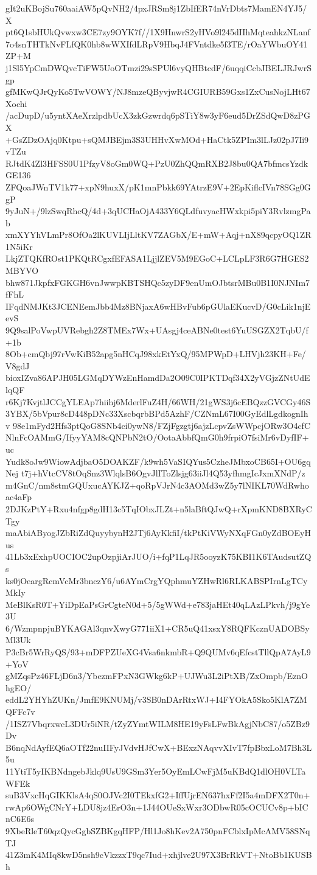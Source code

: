 gIt2uKBojSu760aaiAW5pQvNH2/4pxJRSm8j1ZbIfER74nVrDbts7MamEN4YJ5/X
pt6Q1sbHUkQvwxw3CE7zy9OYK7f//1X9HnwrS2yHVo9l245dIIhMqteahkzNLanf
7o4snTHTkNvFLfQK0hb8wWXIfdLRpV9HbqJ4FVntdke5f3TE/rOaYWbuOY41ZP+M
j1Sl5YpCmDWQvcTiFW5UoOTmzi29sSPUl6vyQHBtcdF/6uqqiCcbJBELJRJwrSgp
gfMKwQJrQyKo5TwVOWY/NJ8mzeQByvjwR4CGIURB59Gxs1ZxCusNojLHt67Xochi
/acDupD/u5yntXAeXrzlpdbUcX3zkGzwrdq6pSTiY8w3yF6eud5DrZSdQwD8zPGX
+GsZDzOAjq0Ktpu+sQMJBEjm3S3UHHvXwMOd+HaCtk5ZPIm3lLJz02pJ7Ii9vTZu
RJtdK4Zl3HFSS0U1PfzyV8oGm0WQ+PzU0ZhQQmRXB2J8bu0QA7bfmcsYzdkGE136
ZFQoaJWnTV1k77+xpN9huxX/pK1mnPbkk69YAtrzE9V+2EpKiflcIVn78SGg0GgP
9yJuN+/9lzSwqRhcQ/4d+3qUCHaOjA433Y6QLdfuvyacHWxkpi5piY3RvlzmgPab
xmXYYhVLmPr8OfOa2lKUVLIjLltKV7ZAGbX/E+mW+Aqj+nX89qcpyOQ1ZR1N5iKr
LkjZTQKfROst1PKQtRCgxfEFASA1LjjlZEV5M9EGoC+LCLpLF3R6G7HGES2MBYVO
bhw871JkpfxFGKGH6vnJwwpKBTSHQc5zyDF9enUmOJbtsrMBu0B1I0NJNIm7fFhL
IFqdNMJKt3JCENEemJbb4Mz8BNjaxA6wHBvFub6pGUlaEKucvD/G0cLik1njEevS
9Q9salPoVwpUVRebgh2Z8TMEx7Wx+UAsgj4ceABNe0test6YuUSGZX2TqbU/f+1b
8Ob+cmQbj97rVwKiB52apg5nHCqJ98xkEtYxQ/95MPWpD+LHVjh23KH+Fe/V8gdJ
bioxIZva86APJH05LGMqDYWzEnHamdDa2O09C0IPKTDqf34X2yVGjzZNtUdElqQF
r6Kj7KvjtlJCCgYLEAp7hiihj6MderlFuZ4H/66WH/21gWS3j6cEBQzzGVCGy46S
3YBX/5bVpur8cD448pDNc33XscbqrbBPd5AzhF/CZNmL67I00GyEdlLgdkognIhv
98e1mFyd2Hfs3ptQoG8SNb4ci0ywN8/FZjFgzgtj6ajzLcpvZsWWpcjORw3O4cfC
NlnFcOAMmG/IfyyYAM8cQNPbN2tO/OotaAbbfQmG0h9frpiO7fsiMr6vDyfIF+uc
Yudk8oJw9WiowAdjbaO5DOAKZF/k9wh5VaSIQYus5CzheJMbxoCB65I+OU6gqNej
t7j+hVtcCV8tOqSnz3WlqlsB6OgvJlIToZlsjg63iiJl4Q53yfhmgIcJxmXNdP/z
m4GnC/nm8stmGQUxucAYKJZ+qoRpVJrN4c3AOMd3wZ5y7lNIKL70WdRwhoac4aFp
2DJKzPtY+Rxu4nfgp8gdH13c5TqIObxJLZt+n5laBftQJwQ+rXpmKND8BXRyCTgy
maAbiAByogJZbRiZdQuyybynH2JTj6AyKkfiI/tkPtKiVWyNXqFGn0yZdBOEyHus
41Lb3xExhpUOCIOC2upOzpjiArJUO/i+fqP1LqJR5ooyzK75KBI1K6TAudsutZQs
ks0jOeargRcmVcMr3bnczY6/u6AYmCrgYQphmuYZHwRl6RLKABSPIrnLgTCyMkIy
MeBlKsR0T+YiDpEaPsGrCgteN0d+5/5gWWd+e783jaHEt40qLAzLPkvh/j9gYe3U
6/WzmpnpjuBYKAGAl3qnvXwyG771iiX1+CR5uQ41xsxY8RQFKcznUADOBSyMl3Uk
P3cBr5WrRyQS/93+mDFPZUeXG4Vsa6nkmbR+Q9QUMv6qEfcstTllQpA7AyL9+YoV
gMZqsPz46FLjD6n3/YbezmFPxN3GWkg6kP+UJWu3L2iPtXB/ZxOmpb/EznOhgEO/
eddL2YHYhZUKn/JmfE9KNUMj/v3SB0nDArRtxWJ+I4FYOkA5Sko5KlA7ZMQFFc7v
/1ISZ7VbqrxwcL3DUr5iNR/tZyZYmtWILM8HE19yFsLFwBkAgjNbC87/o5ZBz9Dv
B6nqNdAyfEQ6aOTf22nuIIFyJVdvHJfCwX+BExzNAqvvXIvT7fpBbxLoM7Bh3L5u
11YtiT5yIKBNdngebJklq9UsU9GSm3Yer5OyEmLCwFjM5uKBdQ1dlOH0VLTaWFEk
suB3VxcHqGIKKlsA4qS0OJVc2I0TEkxfG2+IffUjrEN637hxFf2I5a4mDFX2T0n+
rwAp6OWgCNrY+LDU8jz4ErO3n+1J44OUeSxWxr3ODbwR05cOCUCv8p+bICnC6E6s
9XbeRleT60qzQycGgbSZBKgqHFP/Hl1Jo8hKev2A750pnFCblxIpMcAMV58SNqTJ
41Z3mK4MIq8kwD5nsh9cVkzzxT9qc7Iud+xhjlve2U97X3BrRkVT+NtoBb1KUSBh
